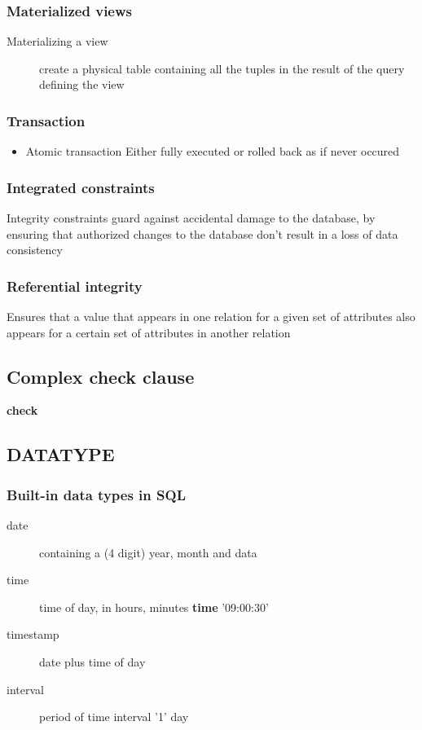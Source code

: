 \documentclass[11pt]{article}
\begin{document}
\subsubsection{Materialized views}
\label{sec-8-2-1}
\begin{description}
\item[{Materializing a view}] create a physical table containing all the tuples in the result of the query
defining the view
\end{description}
\subsubsection{Transaction}
\label{sec-8-2-2}
\begin{itemize}
\item Atomic transaction
Either fully executed or rolled back as if never occured
\end{itemize}
\subsubsection{Integrated constraints}
\label{sec-8-2-3}
Integrity constraints guard against accidental damage to the database,
by ensuring that authorized changes to the database don't result
in a loss of data consistency
\subsubsection{Referential integrity}
\label{sec-8-2-4}
Ensures that a value that appears in one relation for a given set of attributes
also appears for a certain set of attributes in another relation
\subsection{Complex check clause}
\label{sec-8-3}
\textbf{check}
\subsection{DATATYPE}
\label{sec-8-4}
\subsubsection{Built-in data types in SQL}
\label{sec-8-4-1}
\begin{description}
\item[{date}] containing a (4 digit) year, month and data
\item[{time}] time of day, in hours, minutes
\textbf{time} '09:00:30'
\item[{timestamp}] date plus time of day
\item[{interval}] period of time
interval '1' day
\end{description}
\end{document}
